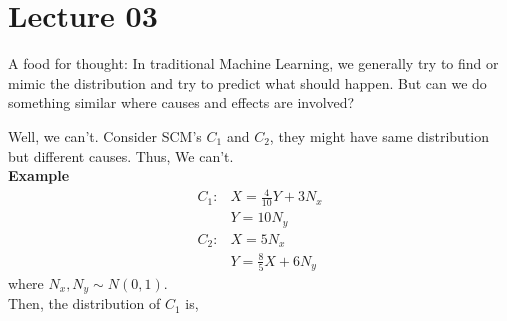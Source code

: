 \documentclass{article}
\begin{document}
    \section{Lecture 03}
    A food for thought: In traditional Machine Learning, we generally try to find or mimic the distribution and try to predict what should happen. But can we do something similar where causes and effects are involved? 

    Well, we can't. Consider SCM's $C_1$ and $C_2$, they might have same distribution but different causes. Thus, We can't.\\
    \textbf{Example}\\
    \begin{align*}
        C_1: & X=\frac{4}{10}Y+3N_x\\
        &Y=10N_y\\
        C_2: &X=5N_x\\
        &Y=\frac{8}{5}X+6N_y
    \end{align*}
    where $N_x,N_y \sim N(0,1)$.\\
    Then, the distribution of $C_1$ is,
\end{document}
